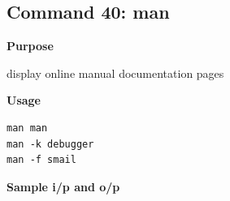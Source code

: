 \subsection{Command 40: man} 
\textbf{Purpose}
\begin{flushleft}
 display online manual documentation pages
\end{flushleft}
\textbf{Usage}
\begin{verbatim}
man man
man -k debugger
man -f smail
\end{verbatim}
\textbf{Sample i/p and o/p}
\begin{figure}[H] 
\end{figure}
